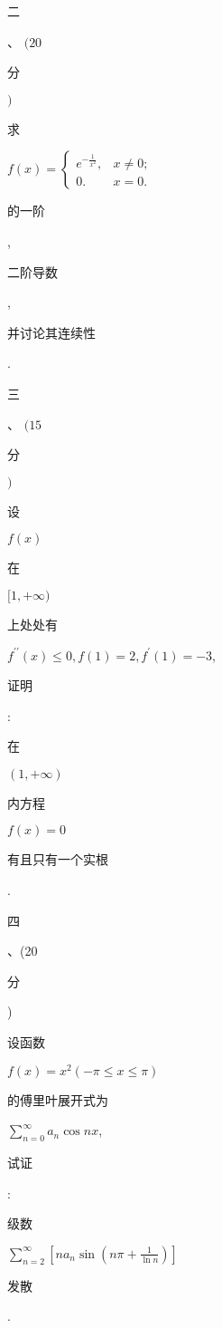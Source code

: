 \documentclass[10pt]{article}
\begin{document}
\begin{CJK}{UTF8}{mj}二\end{CJK}、 $(20$ \begin{CJK}{UTF8}{mj}分\end{CJK} $)$ \begin{CJK}{UTF8}{mj}求\end{CJK} $f(x)=\left\{\begin{array}{ll}e^{-\frac{1}{x^{2}}}, & x \neq 0 ; \\ 0 . & x=0 .\end{array}\right.$ \begin{CJK}{UTF8}{mj}的一阶\end{CJK}, \begin{CJK}{UTF8}{mj}二阶导数\end{CJK}, \begin{CJK}{UTF8}{mj}并讨论其连续性\end{CJK}.

\begin{CJK}{UTF8}{mj}三\end{CJK}、 $(15$ \begin{CJK}{UTF8}{mj}分\end{CJK} $)$ \begin{CJK}{UTF8}{mj}设\end{CJK} $f(x)$ \begin{CJK}{UTF8}{mj}在\end{CJK} $[1,+\infty)$ \begin{CJK}{UTF8}{mj}上处处有\end{CJK} $f^{\prime \prime}(x) \leqslant 0, f(1)=2, f^{\prime}(1)=-3$, \begin{CJK}{UTF8}{mj}证明\end{CJK}: \begin{CJK}{UTF8}{mj}在\end{CJK} $(1,+\infty)$ \begin{CJK}{UTF8}{mj}内方程\end{CJK} $f(x)=0$ \begin{CJK}{UTF8}{mj}有且只有一个实根\end{CJK}.

\begin{CJK}{UTF8}{mj}四\end{CJK}、(20 \begin{CJK}{UTF8}{mj}分\end{CJK}) \begin{CJK}{UTF8}{mj}设函数\end{CJK} $f(x)=x^{2}(-\pi \leqslant x \leqslant \pi)$ \begin{CJK}{UTF8}{mj}的傅里叶展开式为\end{CJK} $\sum_{n=0}^{\infty} a_{n} \cos n x$, \begin{CJK}{UTF8}{mj}试证\end{CJK}: \begin{CJK}{UTF8}{mj}级数\end{CJK} $\sum_{n=2}^{\infty}\left[n a_{n} \sin \left(n \pi+\frac{1}{\ln n}\right)\right]$ \begin{CJK}{UTF8}{mj}发散\end{CJK}.
\end{document}
